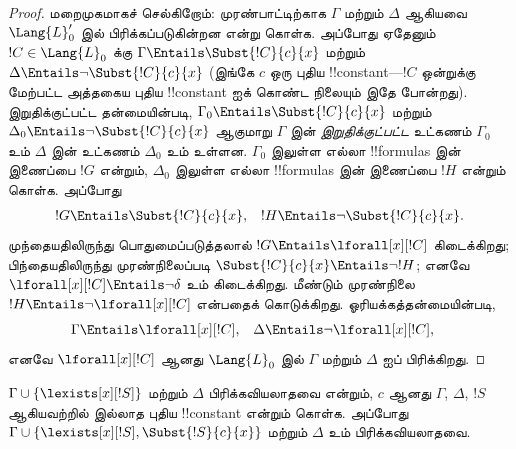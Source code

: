 \documentclass[../../../include/open-logic-section]{subfiles}
\begin{document}
\begin{proof}
மறைமுகமாகச் செல்கிறோம்: முரண்பாட்டிற்காக $\Gamma$ மற்றும் $\Delta$
ஆகியவை $\Lang{L}'_0$ இல் பிரிக்கப்படுகின்றன என்று கொள்க. அப்போது
ஏதேனும் $!C \in
\Lang{L}_0$ க்கு $\Gamma \Entails
\Subst{!C}{c}{x}$ மற்றும் $\Delta \Entails \lnot
\Subst{!C}{c}{x}$ (இங்கே $c$ ஒரு புதிய !!{constant}---$!C$ ஒன்றுக்கு
மேற்பட்ட அத்தகைய புதிய !!{constant} ஐக் கொண்ட நிலையும் இதே போன்றது).
இறுதிக்குட்பட்ட தன்மையின்படி,
$\Gamma_0 \Entails \Subst{!C}{c}{x}$ மற்றும்
$\Delta_0 \Entails \lnot \Subst{!C}{c}{x}$ ஆகுமாறு $\Gamma$ இன்
\emph{இறுதிக்குட்பட்ட} உட்கணம் $\Gamma_0$ உம் $\Delta$ இன்
உட்கணம் $\Delta_0$ உம் உள்ளன. $\Gamma_0$ இலுள்ள எல்லா
!!{formula}s இன் இணைப்பை $!G$ என்றும், $\Delta_0$ இலுள்ள எல்லா
!!{formula}s இன் இணைப்பை $!H$ என்றும் கொள்க. அப்போது
\begin{align*}
  !G & \Entails \Subst{!C}{c}{x}, & !H  \Entails \lnot \Subst{!C}{c}{x}.
\end{align*}
முந்தையதிலிருந்து பொதுமைப்படுத்தலால் $!G \Entails
\lforall[x][!C]$ கிடைக்கிறது; பிந்தையதிலிருந்து முரண்நிலைப்படி
$\Subst{!C}{c}{x} \Entails \lnot !H$; எனவே
$\lforall[x][!C]
\Entails \lnot \delta$ உம் கிடைக்கிறது. மீண்டும் முரண்நிலை
$!H \Entails
\lnot \lforall[x][!C]$ என்பதைக் கொடுக்கிறது. ஓரியக்கத்தன்மையின்படி,
\begin{align*}
  \Gamma &\Entails \lforall[x][!C], &
  \Delta & \Entails \lnot \lforall[x][!C],
\end{align*}
எனவே $\lforall[x][!C]$ ஆனது $\Lang{L}_0$ இல் $\Gamma$ மற்றும்
$\Delta$ ஐப் பிரிக்கிறது.
\end{proof}

\begin{lem}
$\Gamma \cup \{ \lexists[x][!S] \}$ மற்றும் $\Delta$
பிரிக்கவியலாதவை என்றும், $c$ ஆனது $\Gamma$, $\Delta$, $!S$
ஆகியவற்றில் இல்லாத புதிய !!{constant} என்றும் கொள்க. அப்போது
$\Gamma \cup \{ \lexists[x][!S], \Subst{!S}{c}{x} \}$ மற்றும்
$\Delta$ உம் பிரிக்கவியலாதவை.
\end{lem}
\end{document}
